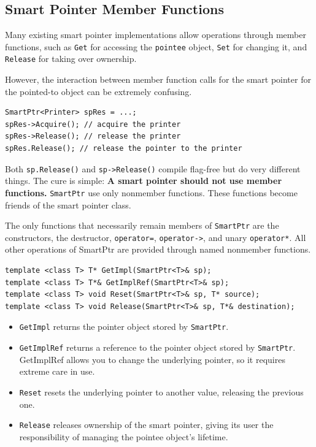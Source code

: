 \subsection{Smart Pointer Member Functions}

Many existing smart pointer implementations allow operations through
member functions, such as \texttt{Get} for accessing the
\texttt{pointee} object, \texttt{Set} for changing it, and
\texttt{Release} for taking over ownership.

However, the interaction between member function calls for the smart
pointer for the pointed-to object can be extremely confusing.
\begin{verbatim}
SmartPtr<Printer> spRes = ...;
spRes->Acquire(); // acquire the printer
spRes->Release(); // release the printer
spRes.Release(); // release the pointer to the printer
\end{verbatim}

Both \texttt{sp.Release()} and \texttt{sp->Release()} compile
flag-free but do very different things. The cure is simple: \textbf{A smart
pointer should not use member functions.} \texttt{SmartPtr} use only 
nonmember functions. These functions become friends of the smart
pointer class. 

The only functions that necessarily remain members of
\texttt{SmartPtr} are the constructors, the destructor,
\texttt{operator=}, \texttt{operator->}, and unary
\texttt{operator*}. All other operations of SmartPtr are provided
through named nonmember functions.
\begin{verbatim}
template <class T> T* GetImpl(SmartPtr<T>& sp);
template <class T> T*& GetImplRef(SmartPtr<T>& sp);
template <class T> void Reset(SmartPtr<T>& sp, T* source);
template <class T> void Release(SmartPtr<T>& sp, T*& destination);
\end{verbatim}

\begin{itemize}
\item \texttt{GetImpl} returns the pointer object stored by \texttt{SmartPtr}.
\item \texttt{GetImplRef} returns a reference to the pointer object stored by
  \texttt{SmartPtr}. GetImplRef allows you to change the underlying pointer, so
  it requires extreme care in use.
\item \texttt{Reset} resets the underlying pointer to another value,
  releasing the previous one. 
\item \texttt{Release} releases ownership of the smart pointer, giving
  its user the responsibility of managing the pointee object's lifetime.
\end{itemize}

